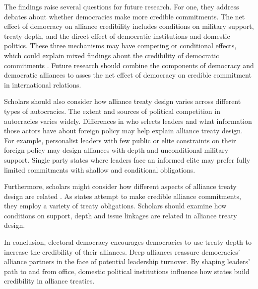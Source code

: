 \documentclass[12pt]{article}
\begin{document}
The findings raise several questions for future research.  
For one, they address debates about whether democracies make more credible commitments. 
The net effect of democracy on alliance credibility includes conditions on military support, treaty depth, and the direct effect of democratic institutions and domestic politics. 
These three mechanisms may have competing or conditional effects, which could explain mixed findings about the credibility of democratic commitments \citep{Schultz1999, Leeds1999, Thyne2012, DownesSechser2012, PotterBaum2014}.
Future research should combine the components of democracy and democratic alliances to asses the net effect of democracy on credible commitment in international relations. 


Scholars should also consider how alliance treaty design varies across different types of autocracies. 
The extent and sources of political competition in autocracies varies widely. 
Differences in who selects leaders and what information those actors have about foreign policy \citep{Weeks2008} may help explain alliance treaty design.
For example, personalist leaders with few public or elite constraints on their foreign policy may design alliances with depth and unconditional military support. 
Single party states where leaders face an informed elite may prefer fully limited commitments with shallow and conditional obligations. 


Furthermore, scholars might consider how different aspects of alliance treaty design are related \citep{FjelstulReiter2019}. 
As states attempt to make credible alliance commitments, they employ a variety of treaty obligations. 
Scholars should examine how conditions on support, depth and issue linkages are related in alliance treaty design. 


In conclusion, electoral democracy encourages democracies to use treaty depth to increase the credibility of their alliances. 
Deep alliances reassure democracies' alliance partners in the face of potential leadership turnover. 
By shaping leaders' path to and from office, domestic political institutions influence how states build credibility in alliance treaties.




 
 
\end{document}
